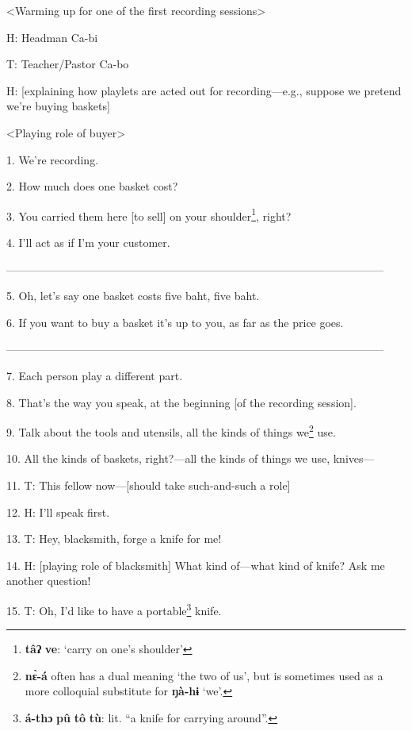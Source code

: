 \setcounter{footnote}{0}

<Warming up for one of the first recording sessions>

H: Headman Ca-bi

T: Teacher/Pastor Ca-bo

H: [explaining how playlets are acted out for recording---e.g., suppose we pretend
we're buying baskets]

<Playing role of buyer>

1. We're recording.

2. How much does one basket cost?

3. You carried them here [to sell] on your shoulder\footnote{\textbf{tâʔ} \textbf{ve}: `carry on one's shoulder'}, right?

4. I'll act as if I'm your customer.

------------------------------------------------------------------------------------------------------


5. Oh, let's say one basket costs five baht, five baht.

6. If you want to buy a basket it's up to you, as far as the price goes.

------------------------------------------------------------------------------------------------------

7. Each person play a different part.

8. That's the way you speak, at the beginning [of the recording session].

9. Talk about the tools and utensils, all the kinds of things we\footnote{\textbf{nɛ̀-á} often has a dual meaning `the two of us', but is sometimes used as a more colloquial substitute for \textbf{ŋà-hɨ} `we'.} use.

10. All the kinds of baskets, right?---all the kinds of things we use, knives---

11. T: This fellow now---[should take such-and-such a role]

12. H: I'll speak first.

13. T: Hey, blacksmith, forge a knife for me!

14. H: [playing role of blacksmith] What kind of---what kind of knife? 
Ask me another question!

15. T: Oh, I'd like to have a portable\footnote{\textbf{á-thɔ} \textbf{pû} \textbf{tô} \textbf{tù}: lit. ``a knife for carrying around''.} knife.

